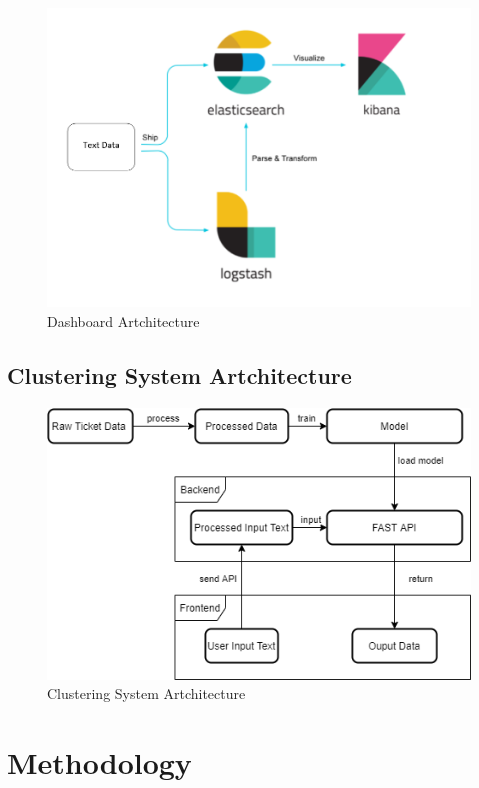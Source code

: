\documentclass[a4paper,12pt]{report}
\begin{document}
    \begin{figure}[h]
        \includegraphics[scale=.5]{dashboard.png}
        \centering
        \caption{Dashboard Artchitecture}
    \end{figure}
    
    \section{Clustering System Artchitecture}
    \begin{figure}[h]
        \includegraphics[scale=.5]{System's Artchitecture.png}
        \centering
        \caption{Clustering System Artchitecture}
    \end{figure}
    
    \chapter{Methodology}
\end{document}

